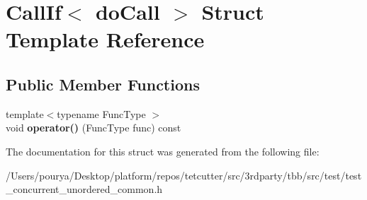 \hypertarget{structCallIf}{}\section{Call\+If$<$ do\+Call $>$ Struct Template Reference}
\label{structCallIf}
\subsection*{Public Member Functions}
\begin{DoxyCompactItemize}
\item 
\hypertarget{structCallIf_aca6565bbec895de21f324826a41b1cef}{}{\footnotesize template$<$typename Func\+Type $>$ }\\void {\bfseries operator()} (Func\+Type func) const \label{structCallIf_aca6565bbec895de21f324826a41b1cef}

\end{DoxyCompactItemize}


The documentation for this struct was generated from the following file\+:\begin{DoxyCompactItemize}
\item 
/\+Users/pourya/\+Desktop/platform/repos/tetcutter/src/3rdparty/tbb/src/test/test\+\_\+concurrent\+\_\+unordered\+\_\+common.\+h\end{DoxyCompactItemize}
